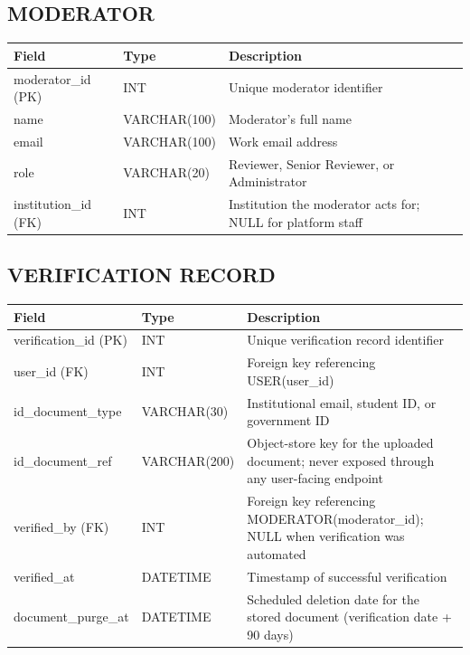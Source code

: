 \documentclass[12pt,a4paper]{report}
\begin{document}
\subsection*{MODERATOR}
\begin{longtable}{L{3.2cm}L{2.5cm}L{8.5cm}}
\toprule
\textbf{Field} & \textbf{Type} & \textbf{Description} \\
\midrule
\endhead
moderator\_id (PK) & INT & Unique moderator identifier \\
name & VARCHAR(100) & Moderator's full name \\
email & VARCHAR(100) & Work email address \\
role & VARCHAR(20) & Reviewer, Senior Reviewer, or Administrator \\
institution\_id (FK) & INT & Institution the moderator acts for; NULL for platform staff \\
\bottomrule
\end{longtable}

\subsection*{VERIFICATION RECORD}
\begin{longtable}{L{3.2cm}L{2.5cm}L{8.5cm}}
\toprule
\textbf{Field} & \textbf{Type} & \textbf{Description} \\
\midrule
\endhead
verification\_id (PK) & INT & Unique verification record identifier \\
user\_id (FK) & INT & Foreign key referencing USER(user\_id) \\
id\_document\_type & VARCHAR(30) & Institutional email, student ID, or government ID \\
id\_document\_ref & VARCHAR(200) & Object-store key for the uploaded document; never exposed through any user-facing endpoint \\
verified\_by (FK) & INT & Foreign key referencing MODERATOR(moderator\_id); NULL when verification was automated \\
verified\_at & DATETIME & Timestamp of successful verification \\
document\_purge\_at & DATETIME & Scheduled deletion date for the stored document (verification date + 90 days) \\
\bottomrule
\end{longtable}
\end{document}
